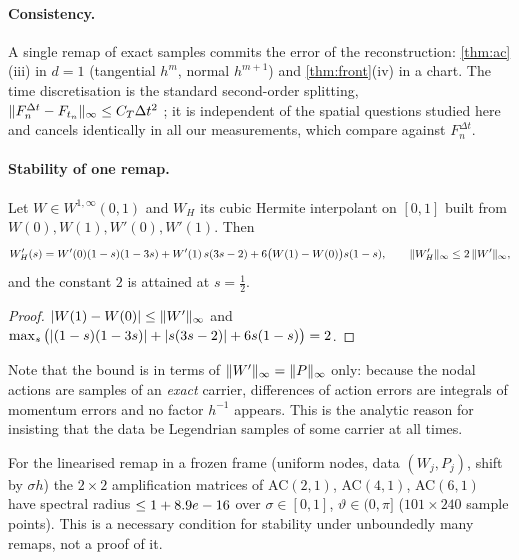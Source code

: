\paragraph{Consistency.} A single remap of exact samples commits the error of the reconstruction:
\cref{thm:ac}(iii) in $d=1$ (tangential $h^m$, normal $h^{m+1}$) and \cref{thm:front}(iv) in a chart. The time
discretisation is the standard second-order splitting, $\lVert F^{\Delta t}_n-F_{t_n}\rVert_\infty\le C_T\Delta t^2$
\cite{HLW}; it is independent of the spatial questions studied here and cancels identically in all our
measurements, which compare against $F^{\Delta t}_n$.

\paragraph{Stability of one remap.}
\begin{lemma}\label{lem:lebesgue}
Let $W\in W^{1,\infty}(0,1)$ and $W_H$ its cubic Hermite interpolant on $[0,1]$ built from $W(0),W(1),W'(0),W'(1)$. Then
\begin{equation}\label{eq:lebesgue}
W_H'(s)=W'(0)(1-s)(1-3s)+W'(1)\,s(3s-2)+6\big(W(1)-W(0)\big)s(1-s),\qquad\lVert W_H'\rVert_\infty\le2\,\lVert W'\rVert_\infty ,
\end{equation}
and the constant $2$ is attained at $s=\tfrac12$.
\end{lemma}
\begin{proof}
$\lvert W(1)-W(0)\rvert\le\lVert W'\rVert_\infty$ and $\max_s\big(\lvert (1-s)(1-3s)\rvert+\lvert s(3s-2)\rvert+6s(1-s)\big)=2$.
\end{proof}
Note that the bound is in terms of $\lVert W'\rVert_\infty=\lVert P\rVert_\infty$ only: because the nodal actions are samples of
an \emph{exact} carrier, differences of action errors are integrals of momentum errors and no factor $h^{-1}$
appears. This is the analytic reason for insisting that the data be Legendrian samples of some carrier at all times.

\begin{observation}\label{obs:vn}
For the linearised remap in a frozen frame (uniform nodes, data $(W_j,P_j)$, shift by $\sigma h$) the $2\times2$
amplification matrices of AC$(2,1)$, AC$(4,1)$, AC$(6,1)$ have spectral radius $\le1+8.9e-16$ over
$\sigma\in[0,1]$, $\vartheta\in(0,\pi]$ ($101\times240$ sample points). This is a necessary condition for stability
under unboundedly many remaps, not a proof of it.
\end{observation}

